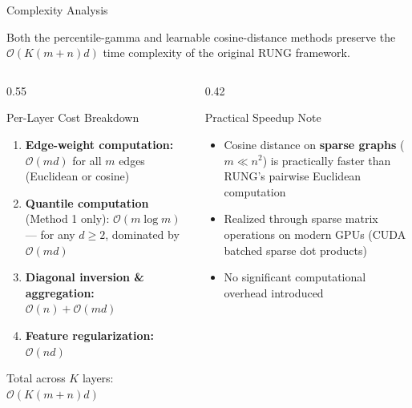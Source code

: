 \documentclass[aspectratio=169]{beamer}
\begin{document}
\begin{frame}{Complexity Analysis}
  \tiny
  \begin{theorem}
    Both the percentile-gamma and learnable cosine-distance methods preserve the $\mathcal{O}(K(m+n)d)$ time complexity of the original RUNG framework.
  \end{theorem}
  \vspace{8pt}
  \begin{columns}[T]
    \begin{column}{0.55\textwidth}
      \begin{block}{Per-Layer Cost Breakdown}
        \begin{enumerate}
          \item \textbf{Edge-weight computation:} $\mathcal{O}(md)$ for all $m$ edges (Euclidean or cosine)
          \item \textbf{Quantile computation} (Method 1 only): $\mathcal{O}(m \log m)$ --- for any $d \geq 2$, dominated by $\mathcal{O}(md)$
          \item \textbf{Diagonal inversion \& aggregation:} $\mathcal{O}(n) + \mathcal{O}(md)$
          \item \textbf{Feature regularization:} $\mathcal{O}(nd)$
        \end{enumerate}
        \vspace{4pt}
        Total across $K$ layers: $\mathcal{O}(K(m+n)d)$ \checkmark
      \end{block}
    \end{column}
    \begin{column}{0.42\textwidth}
      \begin{block}{Practical Speedup Note}
        \begin{itemize}
          \item Cosine distance on \textbf{sparse graphs} ($m \ll n^2$) is practically faster than RUNG's pairwise Euclidean computation
          \item Realized through sparse matrix operations on modern GPUs (CUDA batched sparse dot products)
          \item No significant computational overhead introduced
        \end{itemize}
      \end{block}
    \end{column}
  \end{columns}
\end{frame}
\end{document}
